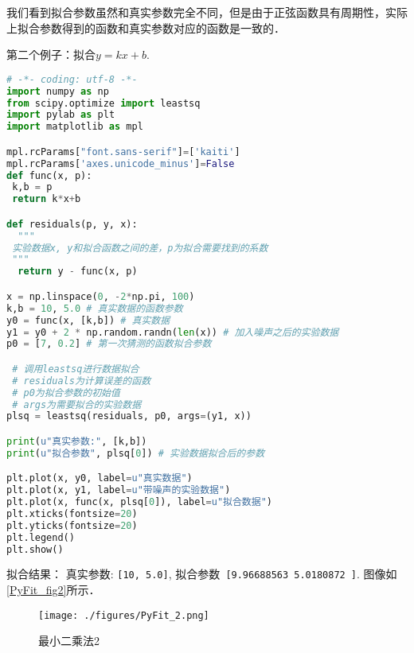我们看到拟合参数虽然和真实参数完全不同，但是由于正弦函数具有周期性，实际上拟合参数得到的函数和真实参数对应的函数是一致的．

第二个例子：拟合$y=kx+b$.
\begin{lstlisting}[language=python]
# -*- coding: utf-8 -*-
import numpy as np
from scipy.optimize import leastsq
import pylab as plt
import matplotlib as mpl

mpl.rcParams["font.sans-serif"]=['kaiti']
mpl.rcParams['axes.unicode_minus']=False
def func(x, p):
 k,b = p
 return k*x+b

def residuals(p, y, x):
  """
 实验数据x, y和拟合函数之间的差，p为拟合需要找到的系数
 """
  return y - func(x, p)

x = np.linspace(0, -2*np.pi, 100)
k,b = 10, 5.0 # 真实数据的函数参数
y0 = func(x, [k,b]) # 真实数据
y1 = y0 + 2 * np.random.randn(len(x)) # 加入噪声之后的实验数据
p0 = [7, 0.2] # 第一次猜测的函数拟合参数

 # 调用leastsq进行数据拟合
 # residuals为计算误差的函数
 # p0为拟合参数的初始值
 # args为需要拟合的实验数据
plsq = leastsq(residuals, p0, args=(y1, x))

print(u"真实参数:", [k,b])
print(u"拟合参数", plsq[0]) # 实验数据拟合后的参数

plt.plot(x, y0, label=u"真实数据")
plt.plot(x, y1, label=u"带噪声的实验数据")
plt.plot(x, func(x, plsq[0]), label=u"拟合数据")
plt.xticks(fontsize=20)
plt.yticks(fontsize=20)
plt.legend()
plt.show()
\end{lstlisting}
拟合结果： 真实参数: \verb|[10, 5.0]|, 拟合参数\verb| [9.96688563 5.0180872 ]|. 图像如\autoref{PyFit_fig2}所示．
\begin{figure}[ht]
\centering
\texttt{[image: ./figures/PyFit\_2.png]}
\caption{最小二乘法2} \label{PyFit_fig2}
\end{figure}


